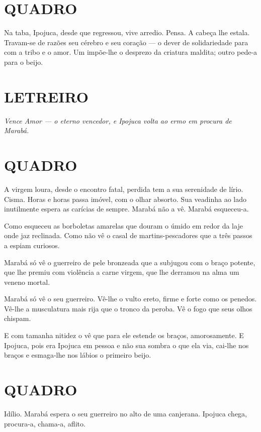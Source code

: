 \section{QUADRO}

Na taba, Ipojuca, desde que regressou, vive arredio. Pensa. A cabeça lhe
estala. Travam-se de razões seu cérebro e seu coração --- o dever de
solidariedade para com a tribo e o amor. Um impõe-lhe o desprezo da
criatura maldita; outro pede-a para o beijo.

\section{LETREIRO}

\emph{Vence Amor --- o eterno vencedor, e Ipojuca volta ao ermo em
procura de Marabá.}

\section{QUADRO}

A virgem loura, desde o encontro fatal, perdida tem a sua serenidade de
lírio. Cisma. Horas e horas passa imóvel, com o olhar absorto. Sua
veadinha ao lado inutilmente espera as carícias de sempre. Marabá não a
vê. Marabá esqueceu-a.

Como esqueceu as borboletas amarelas que douram o úmido em redor da laje
onde jaz reclinada. Como não vê o casal de martins-pescadores que a três
passos a espiam curiosos.

Marabá só vê o guerreiro de pele bronzeada que a subjugou com o braço
potente, que lhe premiu com violência a carne virgem, que lhe derramou
na alma um veneno mortal.

Marabá só vê o seu guerreiro. Vê-lhe o vulto ereto, firme e forte como
os penedos. Vê-lhe a musculatura mais rija que o tronco da peroba. Vê o
fogo que seus olhos chispam.

E com tamanha nitidez o vê que para ele estende os braços, amorosamente.
E Ipojuca, pois era Ipojuca em pessoa e não sua sombra o que ela via,
cai-lhe nos braços e esmaga-lhe nos lábios o primeiro beijo.

\section{QUADRO}

Idílio. Marabá espera o seu guerreiro no alto de uma canjerana. Ipojuca
chega, procura-a, chama-a, aflito.

